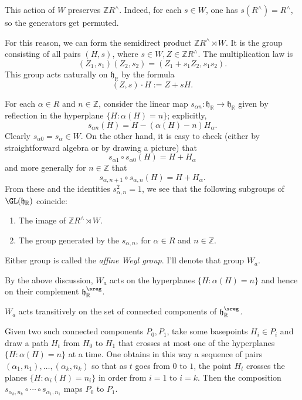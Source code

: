 \documentclass[reqno]{amsart} 
\begin{document}
This action of $W$ preserves $\mathbb{Z} R^\wedge$.  Indeed, for each $s \in W$, one has $s(R^\wedge) = R^\wedge$, so the generators get permuted.

For this reason, we can form the semidirect product $\mathbb{Z} R^\wedge \rtimes W$.  It is the group consisting of all pairs $(H,s)$, where $s \in W, Z \in \mathbb{Z} R^\wedge$.  The multiplication law is
\begin{equation*}
  (Z_1,s_1) (Z_2,s_2) = (Z_1 + s_1 Z_2, s_1 s_2).
\end{equation*}
This group acts naturally on $\mathfrak{h}_\mathbb{R}$ by the formula
\begin{equation*}
  (Z,s) \cdot H := Z + s H.
\end{equation*}

For each $\alpha \in R$ and $n \in \mathbb{Z}$, consider the linear map $s_{\alpha n} : \mathfrak{h}_\mathbb{R} \rightarrow \mathfrak{h}_\mathbb{R}$ given by reflection in the hyperplane $\{H : \alpha(H) = n\}$; explicitly,
\begin{equation*}
  s_{\alpha n}(H) = H - (\alpha(H) - n) H_\alpha.
\end{equation*}
Clearly $s_{\alpha 0} = s_\alpha \in W$.  On the other hand, it is easy to check (either by straightforward algebra or by drawing a picture) that
\begin{equation*}
  s_{\alpha 1} \circ s_{\alpha 0}(H) = H + H_\alpha
\end{equation*}
and more generally for $n \in \mathbb{Z}$ that
\begin{equation*}
  s_{\alpha,n+1 } \circ s_{\alpha, n}(H) = H + H_\alpha.
\end{equation*}
From these and the identities $s_{\alpha,n}^2 = 1$, we see that the following subgroups of $\GL(\mathfrak{h}_\mathbb{R})$ coincide:
\begin{enumerate}
\item The image of $\mathbb{Z} R^\wedge \rtimes W$.
\item The group generated by the $s_{\alpha,n}$, for $\alpha \in R$ and $n \in \mathbb{Z}$.
\end{enumerate}
Either group is called the \emph{affine Weyl group}.  I'll denote that group $W_a$.

By the above discussion, $W_a$ acts on the hyperplanes $\{H : \alpha(H) = n\}$ and hence on their complement $\mathfrak{h}_\mathbb{R}^{\sreg}$.
\begin{lemma}
  $W_a$ acts transitively on the set of connected components of $\mathfrak{h}_\mathbb{R}^{\sreg}$.
\end{lemma}
\begin{lemma}
  Given two such connected components $P_0, P_1$, take some basepoints $H_i \in P_i$ and draw a path $H_t$ from $H_0$ to $H_1$ that crosses at most one of the hyperplanes $\{H : \alpha(H) = n\}$ at a time.  One obtains in this way a sequence of pairs $(\alpha_1,n_1),\dotsc,(\alpha_k,n_k)$ so that as $t$ goes from $0$ to $1$, the point $H_t$ crosses the planes $\{H : \alpha_i(H) = n_i\}$ in order from $i=1$ to $i=k$.  Then the composition $s_{\alpha_k,n_k} \circ \dotsb \circ s_{\alpha_1,n_1}$ maps $P_0$ to $P_1$.
\end{lemma}
\end{document}
